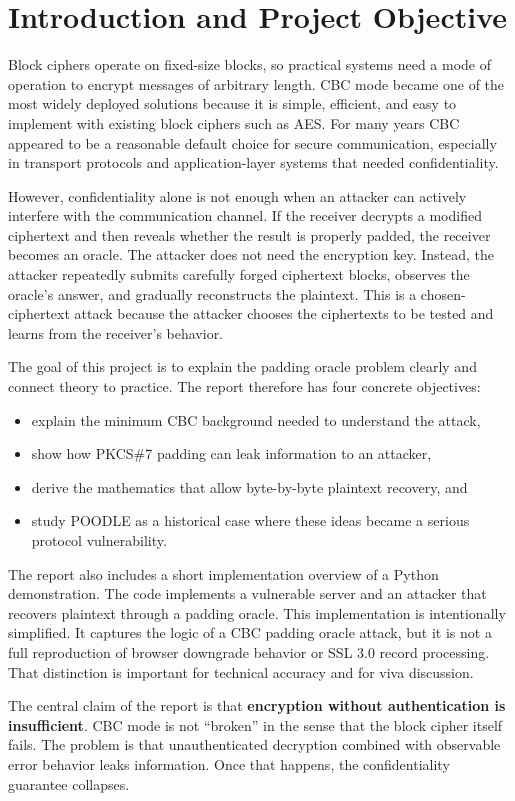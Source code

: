 \section{Introduction and Project Objective}

Block ciphers operate on fixed-size blocks, so practical systems need a mode of operation to encrypt messages of arbitrary length. CBC mode became one of the most widely deployed solutions because it is simple, efficient, and easy to implement with existing block ciphers such as AES. For many years CBC appeared to be a reasonable default choice for secure communication, especially in transport protocols and application-layer systems that needed confidentiality.

However, confidentiality alone is not enough when an attacker can actively interfere with the communication channel. If the receiver decrypts a modified ciphertext and then reveals whether the result is properly padded, the receiver becomes an oracle. The attacker does not need the encryption key. Instead, the attacker repeatedly submits carefully forged ciphertext blocks, observes the oracle's answer, and gradually reconstructs the plaintext. This is a chosen-ciphertext attack because the attacker chooses the ciphertexts to be tested and learns from the receiver's behavior.

The goal of this project is to explain the padding oracle problem clearly and connect theory to practice. The report therefore has four concrete objectives:

\begin{itemize}
    \item explain the minimum CBC background needed to understand the attack,
    \item show how PKCS\#7 padding can leak information to an attacker,
    \item derive the mathematics that allow byte-by-byte plaintext recovery, and
    \item study POODLE as a historical case where these ideas became a serious protocol vulnerability.
\end{itemize}

The report also includes a short implementation overview of a Python demonstration. The code implements a vulnerable server and an attacker that recovers plaintext through a padding oracle. This implementation is intentionally simplified. It captures the logic of a CBC padding oracle attack, but it is not a full reproduction of browser downgrade behavior or SSL 3.0 record processing. That distinction is important for technical accuracy and for viva discussion.

The central claim of the report is that \textbf{encryption without authentication is insufficient}. CBC mode is not ``broken'' in the sense that the block cipher itself fails. The problem is that unauthenticated decryption combined with observable error behavior leaks information. Once that happens, the confidentiality guarantee collapses.
